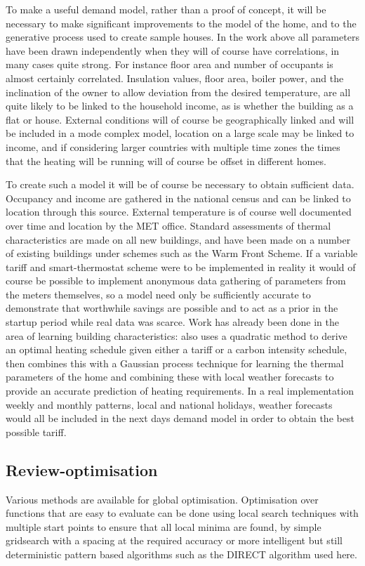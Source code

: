 \documentclass[a4paper, 10 pt, conference]{ieeeconf}  %
\begin{document}
To make a useful demand model, rather than a proof of concept, it will be necessary to make significant improvements to the model of the home, and to the generative process used to create sample houses. In the work above all parameters have been drawn independently when they will of course have correlations, in many cases quite strong. For instance floor area and number of occupants is almost certainly correlated. Insulation values, floor area, boiler power, and the inclination of the owner to allow deviation from the desired temperature, are all quite likely to be linked to the household income, as is whether the building as a flat or house. External conditions will of course be geographically linked and will be included in a mode complex model, location on a large scale may be linked to income, and if considering larger countries with multiple time zones the times that the heating will be running will of course be offset in different homes.

To create such a model it will be of course be necessary to obtain sufficient data. Occupancy and income are gathered in the national census and can be linked to location through this source. External temperature is of course well documented over time and location by the MET office. Standard assessments of thermal characteristics are made on all new buildings, and have been made on a number of existing buildings under schemes such as the Warm Front Scheme\cite{warmfront}. If a variable tariff and smart-thermostat scheme were to be implemented in reality it would of course be possible to implement anonymous data gathering of parameters from the meters themselves, so a model need only be sufficiently accurate to demonstrate that worthwhile savings are possible and to act as a prior in the startup period while real data was scarce. Work has already been done in the area of learning building characteristics: \cite{rogers2011adaptive} also uses a quadratic method to derive an optimal heating schedule given either a tariff or a carbon intensity schedule, then combines this with a Gaussian process technique for learning the thermal parameters of the home and combining these with local weather forecasts to provide an accurate prediction of heating requirements. In a real implementation weekly and monthly patterns, local and national holidays, weather forecasts would all be included in the next days demand model in order to obtain the best possible tariff.


\subsection{Review-optimisation}
\label{reviewoptimisation}
Various methods are available for global optimisation. Optimisation over functions that are easy to evaluate can be done using local search techniques with multiple start points to ensure that all local minima are found, by simple gridsearch with a spacing at the required accuracy or more intelligent but still deterministic pattern based algorithms such as the DIRECT algorithm \cite{jones1993lipschitzian} used here. %
\end{document}

